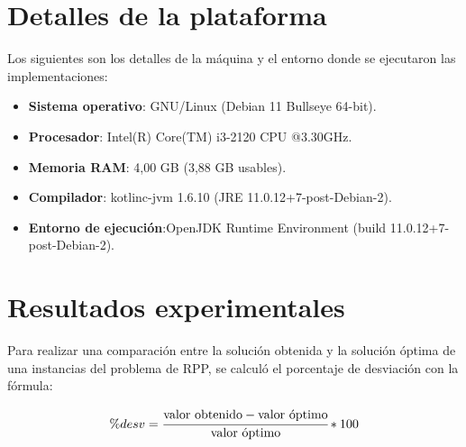 \documentclass[11pt]{article}
\begin{document}
\section{Detalles de la plataforma}
Los siguientes son los detalles de la máquina y el entorno donde se ejecutaron las implementaciones:

\begin{itemize}
   \item \textbf{Sistema operativo}: GNU/Linux (Debian 11 Bullseye 64-bit).
   \item \textbf{Procesador}: Intel(R) Core(TM) i3-2120 CPU @3.30GHz.
   \item \textbf{Memoria RAM}: 4,00 GB (3,88 GB usables).
   \item \textbf{Compilador}: kotlinc-jvm 1.6.10 (JRE 11.0.12+7-post-Debian-2).
   \item \textbf{Entorno de ejecución}:OpenJDK Runtime Environment (build 11.0.12+7-post-Debian-2).
\end{itemize}

\section{Resultados experimentales}

Para realizar una comparación entre la solución obtenida y la solución óptima de una instancias
del problema de RPP, se calculó el porcentaje de desviación con la fórmula:

\begin{equation}
    \%desv = \cfrac{\text{valor obtenido} - \text{valor óptimo}}{\text{valor óptimo}} *100
\end{equation}
\end{document}
